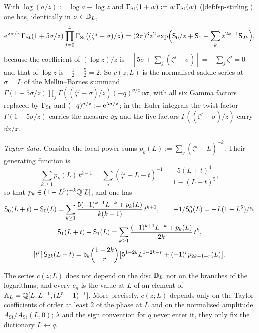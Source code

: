 With $\log(a/z):=\log a-\log z$ and $\Gamma_{\mathrm{St}}(1+w):=w\,\Gamma_{\mathrm{St}}(w)$ (\cref{def:fsp-stirling}) one has, identically in $\sigma\in\mathbb{D}_L$,
\[
\mathrm{e}^{\lambda\sigma/z}\,\Gamma_{\mathrm{St}}(1+5\sigma/z)\prod_{j=0}^4\Gamma_{\mathrm{St}}\bigl((\zeta^j-\sigma)/z\bigr)=(2\pi)^3z^2\exp\Bigl(\mathsf S_0/z+\mathsf S_1+\sum_kz^{2k-1}\mathsf S_{2k}\Bigr),
\]
because the coefficient of $(\log z)/z$ is $-[5\sigma+\sum_j(\zeta^j-\sigma)]=-\sum_j\zeta^j=0$ and that of $\log z$ is $-\frac12+\frac52=2$. So $c(z;L)$ is the normalised saddle series at $\sigma=L$ of the Mellin--Barnes summand $\Gamma(1+5\sigma/z)\prod_j\Gamma((\zeta^j-\sigma)/z)(-q)^{\sigma/z}\,\dd\sigma$, with all six Gamma factors replaced by $\Gamma_{\mathrm{St}}$ and $(-q)^{\sigma/z}:=\mathrm{e}^{\lambda\sigma/z}$; in the Euler integrals the twist factor $\Gamma(1+5\sigma/z)$ carries the measure $\dd y$ and the five factors $\Gamma((\zeta^j-\sigma)/z)$ carry $\dd x/x$.

\emph{Taylor data.} Consider the local power sums $p_k(L):=\sum_j(\zeta^j-L)^{-k}$. Their generating function is
\[
\sum_{k\geq1}p_k(L)\,t^{k-1}=\sum_j(\zeta^j-L-t)^{-1}=\frac{5(L+t)^4}{1-(L+t)^5},
\]
so that $p_k\in(1-L^5)^{-k}\mathbb{Q}[L]$, and one has
\begin{gather*}
\mathsf S_0(L+t)-\mathsf S_0(L)=\sum_{k\geq1}\frac{5(-1)^{k+1}L^{-k}+p_k(L)}{k(k+1)}\,t^{k+1},\qquad
-1/\mathsf S_0''(L)=-L(1-L^5)/5,\\
\mathsf S_1(L+t)-\mathsf S_1(L)=\sum_{k\geq1}\frac{(-1)^{k+1}L^{-k}+p_k(L)}{2k}\,t^{k},\\
[t^r]\,\mathsf S_{2k}(L+t)=\mathsf{b}_k\binom{1-2k}{r}\bigl[5^{1-2k}L^{1-2k-r}+(-1)^rp_{2k-1+r}(L)\bigr].
\end{gather*}

\begin{prop}[Rationality]
\label{prop:gam-rational}
The series $c(z;L)$ does not depend on the disc $\mathbb{D}_L$ nor on the branches of the logarithms, and every $c_n$ is the value at $L$ of an element of $\mathbb{A}_{L}=\mathbb{Q}[L,L^{-1},(L^5-1)^{-1}]$. More precisely, $c(z;L)$ depends only on the Taylor coefficients of order at least $2$ of the phase at $L$ and on the normalised amplitude $A_{\mathrm{St}}/A_{\mathrm{St}}(L,0)$; $\lambda$ and the sign convention for $q$ never enter it, they only fix the dictionary $L\leftrightarrow q$.
\end{prop}

